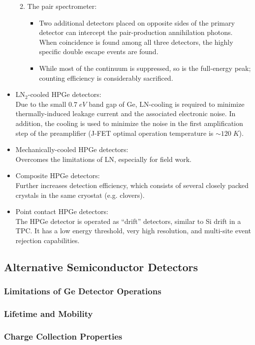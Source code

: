 \begin{itemize}
\begin{enumerate}
\begin{itemize}
            \end{itemize}
        \item The pair spectrometer: 
        \begin{itemize}
            \item Two additional detectors placed on opposite sides of the primary detector can intercept the pair-production annihilation photons. When coincidence is found among all three detectors, the highly specific double escape events are found.
            \item While most of the continuum is suppressed, so is the full-energy peak; counting efficiency is considerably sacrificed. 
        \end{itemize}
    \end{enumerate}
    \item LN$_2$-cooled HPGe detectors:\\
    Due to the small $0.7\;eV$ band gap of Ge, LN-cooling is required to minimize thermally-induced leakage current and the associated electronic noise. In addition, the cooling is used to minimize the noise in the first amplification step of the preamplifier (J-FET optimal operation temperature is $\sim120\;K$). 
    \item Mechanically-cooled HPGe detectors:\\
    Overcomes the limitations of LN, especially for field work.
    \item Composite HPGe detectors:\\
    Further increases detection efficiency, which consists of several closely packed crystals in the same cryostat (e.g. clovers).
    \item Point contact HPGe detectors:\\
    The HPGe detector is operated as ``drift'' detectors, similar to Si drift in a TPC. It has a low energy threshold, very high resolution, and multi-site event rejection capabilities. 
\end{itemize}

\subsection{Alternative Semiconductor Detectors}
\subsubsection{Limitations of Ge Detector Operations}
\subsubsection{Lifetime and Mobility}
\subsubsection{Charge Collection Properties}